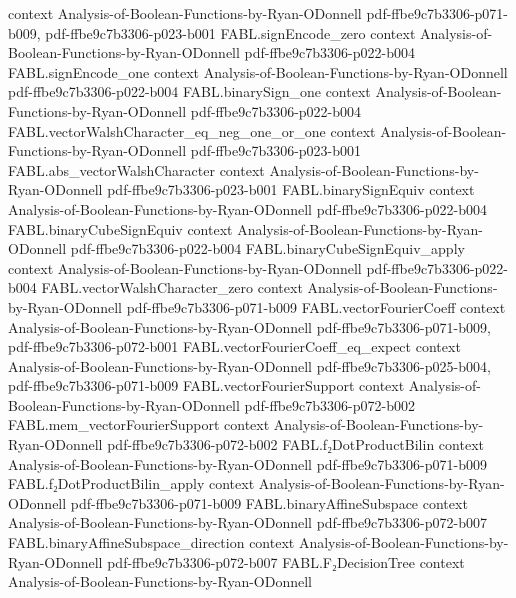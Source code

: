 \begin{theorem}
  {context}
  {Analysis-of-Boolean-Functions-by-Ryan-ODonnell}
  {pdf-ffbe9c7b3306-p071-b009,
    pdf-ffbe9c7b3306-p023-b001}
\proofstep
  {FABL.signEncode_zero}
  {context}
  {Analysis-of-Boolean-Functions-by-Ryan-ODonnell}
  {pdf-ffbe9c7b3306-p022-b004}
\proofstep
  {FABL.signEncode_one}
  {context}
  {Analysis-of-Boolean-Functions-by-Ryan-ODonnell}
  {pdf-ffbe9c7b3306-p022-b004}
\proofstep
  {FABL.binarySign_one}
  {context}
  {Analysis-of-Boolean-Functions-by-Ryan-ODonnell}
  {pdf-ffbe9c7b3306-p022-b004}
\proofstep
  {FABL.vectorWalshCharacter_eq_neg_one_or_one}
  {context}
  {Analysis-of-Boolean-Functions-by-Ryan-ODonnell}
  {pdf-ffbe9c7b3306-p023-b001}
\proofstep
  {FABL.abs_vectorWalshCharacter}
  {context}
  {Analysis-of-Boolean-Functions-by-Ryan-ODonnell}
  {pdf-ffbe9c7b3306-p023-b001}
\proofstep
  {FABL.binarySignEquiv}
  {context}
  {Analysis-of-Boolean-Functions-by-Ryan-ODonnell}
  {pdf-ffbe9c7b3306-p022-b004}
\proofstep
  {FABL.binaryCubeSignEquiv}
  {context}
  {Analysis-of-Boolean-Functions-by-Ryan-ODonnell}
  {pdf-ffbe9c7b3306-p022-b004}
\proofstep
  {FABL.binaryCubeSignEquiv_apply}
  {context}
  {Analysis-of-Boolean-Functions-by-Ryan-ODonnell}
  {pdf-ffbe9c7b3306-p022-b004}
\proofstep
  {FABL.vectorWalshCharacter_zero}
  {context}
  {Analysis-of-Boolean-Functions-by-Ryan-ODonnell}
  {pdf-ffbe9c7b3306-p071-b009}
\proofstep
  {FABL.vectorFourierCoeff}
  {context}
  {Analysis-of-Boolean-Functions-by-Ryan-ODonnell}
  {pdf-ffbe9c7b3306-p071-b009,
    pdf-ffbe9c7b3306-p072-b001}
\proofstep
  {FABL.vectorFourierCoeff_eq_expect}
  {context}
  {Analysis-of-Boolean-Functions-by-Ryan-ODonnell}
  {pdf-ffbe9c7b3306-p025-b004,
    pdf-ffbe9c7b3306-p071-b009}
\proofstep
  {FABL.vectorFourierSupport}
  {context}
  {Analysis-of-Boolean-Functions-by-Ryan-ODonnell}
  {pdf-ffbe9c7b3306-p072-b002}
\proofstep
  {FABL.mem_vectorFourierSupport}
  {context}
  {Analysis-of-Boolean-Functions-by-Ryan-ODonnell}
  {pdf-ffbe9c7b3306-p072-b002}
\proofstep
  {FABL.f₂DotProductBilin}
  {context}
  {Analysis-of-Boolean-Functions-by-Ryan-ODonnell}
  {pdf-ffbe9c7b3306-p071-b009}
\proofstep
  {FABL.f₂DotProductBilin_apply}
  {context}
  {Analysis-of-Boolean-Functions-by-Ryan-ODonnell}
  {pdf-ffbe9c7b3306-p071-b009}
\proofstep
  {FABL.binaryAffineSubspace}
  {context}
  {Analysis-of-Boolean-Functions-by-Ryan-ODonnell}
  {pdf-ffbe9c7b3306-p072-b007}
\proofstep
  {FABL.binaryAffineSubspace_direction}
  {context}
  {Analysis-of-Boolean-Functions-by-Ryan-ODonnell}
  {pdf-ffbe9c7b3306-p072-b007}
\proofstep
  {FABL.F₂DecisionTree}
  {context}
  {Analysis-of-Boolean-Functions-by-Ryan-ODonnell}

\end{theorem}
